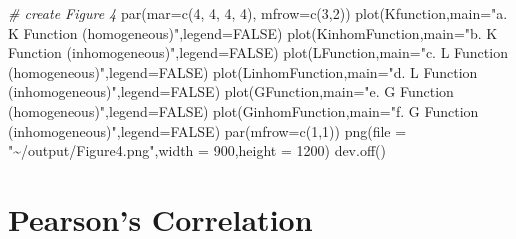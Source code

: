 \documentclass[
]{article}
\newenvironment{Shaded}{\begin{snugshade}}{\end{snugshade}}
\newcommand{\AttributeTok}[1]{\textcolor[rgb]{0.77,0.63,0.00}{#1}}
\newcommand{\CommentTok}[1]{\textcolor[rgb]{0.56,0.35,0.01}{\textit{#1}}}
\newcommand{\ConstantTok}[1]{\textcolor[rgb]{0.00,0.00,0.00}{#1}}
\newcommand{\DecValTok}[1]{\textcolor[rgb]{0.00,0.00,0.81}{#1}}
\newcommand{\FunctionTok}[1]{\textcolor[rgb]{0.00,0.00,0.00}{#1}}
\newcommand{\NormalTok}[1]{#1}
\newcommand{\StringTok}[1]{\textcolor[rgb]{0.31,0.60,0.02}{#1}}
\begin{document}
\begin{Shaded}
\begin{Highlighting}[]
\CommentTok{\# create Figure 4}
\FunctionTok{par}\NormalTok{(}\AttributeTok{mar=}\FunctionTok{c}\NormalTok{(}\DecValTok{4}\NormalTok{, }\DecValTok{4}\NormalTok{, }\DecValTok{4}\NormalTok{, }\DecValTok{4}\NormalTok{), }\AttributeTok{mfrow=}\FunctionTok{c}\NormalTok{(}\DecValTok{3}\NormalTok{,}\DecValTok{2}\NormalTok{))}
\FunctionTok{plot}\NormalTok{(Kfunction,}\AttributeTok{main=}\StringTok{"a. K Function (homogeneous)"}\NormalTok{,}\AttributeTok{legend=}\ConstantTok{FALSE}\NormalTok{)}
\FunctionTok{plot}\NormalTok{(KinhomFunction,}\AttributeTok{main=}\StringTok{"b. K Function (inhomogeneous)"}\NormalTok{,}\AttributeTok{legend=}\ConstantTok{FALSE}\NormalTok{)}
\FunctionTok{plot}\NormalTok{(LFunction,}\AttributeTok{main=}\StringTok{"c. L Function (homogeneous)"}\NormalTok{,}\AttributeTok{legend=}\ConstantTok{FALSE}\NormalTok{)}
\FunctionTok{plot}\NormalTok{(LinhomFunction,}\AttributeTok{main=}\StringTok{"d. L Function (inhomogeneous)"}\NormalTok{,}\AttributeTok{legend=}\ConstantTok{FALSE}\NormalTok{) }
\FunctionTok{plot}\NormalTok{(GFunction,}\AttributeTok{main=}\StringTok{"e. G Function (homogeneous)"}\NormalTok{,}\AttributeTok{legend=}\ConstantTok{FALSE}\NormalTok{) }
\FunctionTok{plot}\NormalTok{(GinhomFunction,}\AttributeTok{main=}\StringTok{"f. G Function (inhomogeneous)"}\NormalTok{,}\AttributeTok{legend=}\ConstantTok{FALSE}\NormalTok{)}
\FunctionTok{par}\NormalTok{(}\AttributeTok{mfrow=}\FunctionTok{c}\NormalTok{(}\DecValTok{1}\NormalTok{,}\DecValTok{1}\NormalTok{))}
\FunctionTok{png}\NormalTok{(}\AttributeTok{file =} \StringTok{"\textasciitilde{}/output/Figure4.png"}\NormalTok{,}\AttributeTok{width =} \DecValTok{900}\NormalTok{,}\AttributeTok{height =} \DecValTok{1200}\NormalTok{)}
\FunctionTok{dev.off}\NormalTok{()}
\end{Highlighting}
\end{Shaded}

\hypertarget{pearsons-correlation}{%
\section{Pearson's Correlation}\label{pearsons-correlation}}
\end{document}
